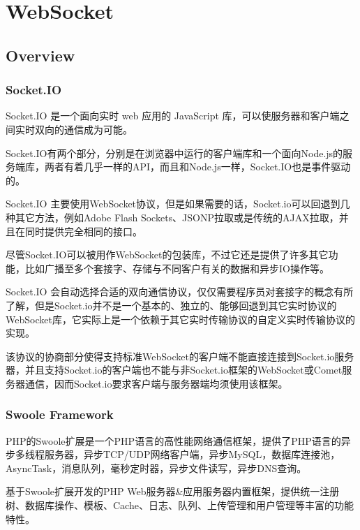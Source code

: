 \part{WebSocket}



\chapter{Overview}






\section{Socket.IO}


Socket.IO 是一个面向实时 web 应用的 JavaScript 库，可以使服务器和客户端之间实时双向的通信成为可能。

Socket.IO有两个部分，分别是在浏览器中运行的客户端库和一个面向Node.js的服务端库，两者有着几乎一样的API，而且和Node.js一样，Socket.IO也是事件驱动的。

Socket.IO 主要使用WebSocket协议，但是如果需要的话，Socket.io可以回退到几种其它方法，例如Adobe Flash Sockets、JSONP拉取或是传统的AJAX拉取，并且在同时提供完全相同的接口。

尽管Socket.IO可以被用作WebSocket的包装库，不过它还是提供了许多其它功能，比如广播至多个套接字、存储与不同客户有关的数据和异步IO操作等。

Socket.IO 会自动选择合适的双向通信协议，仅仅需要程序员对套接字的概念有所了解，但是Socket.io并不是一个基本的、独立的、能够回退到其它实时协议的WebSocket库，它实际上是一个依赖于其它实时传输协议的自定义实时传输协议的实现。


该协议的协商部分使得支持标准WebSocket的客户端不能直接连接到Socket.io服务器，并且支持Socket.io的客户端也不能与非Socket.io框架的WebSocket或Comet服务器通信，因而Socket.io要求客户端与服务器端均须使用该框架。


\section{Swoole Framework}


PHP的Swoole扩展是一个PHP语言的高性能网络通信框架，提供了PHP语言的异步多线程服务器，异步TCP/UDP网络客户端，异步MySQL，数据库连接池，AsyncTask，消息队列，毫秒定时器，异步文件读写，异步DNS查询。

基于Swoole扩展开发的PHP Web服务器\&应用服务器内置框架，提供统一注册树、数据库操作、模板、Cache、日志、队列、上传管理和用户管理等丰富的功能特性。

